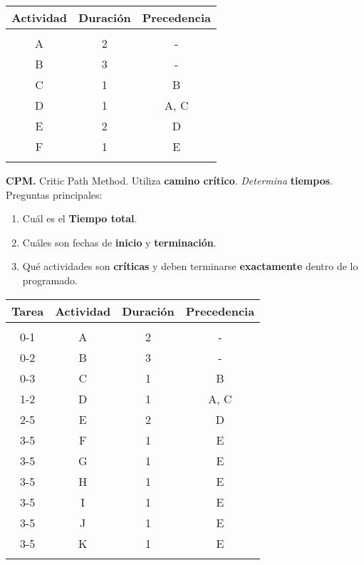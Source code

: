 \documentclass{article}
\begin{document}
\begin{center}
    \begin{tabular}{ c c c }
        Actividad & Duración & Precedencia\\
        \hline \\
        A         & 2        & -           \\
        B         & 3        & -           \\
        C         & 1        & B           \\
        D         & 1        & A, C        \\
        E         & 2        & D           \\
        F         & 1        & E           \\
        \hline\\
    \end{tabular}
\end{center}



\textbf{CPM.}
Critic Path Method.
Utiliza \textbf{camino crítico}.
\textit{Determina} \textbf{tiempos}.
Preguntas principales:

\begin{enumerate}
    \item Cuál es el \textbf{Tiempo total}.
    \item Cuáles son fechas de \textbf{inicio} y \textbf{terminación}.
    \item Qué actividades son \textbf{críticas} y deben terminarse \textbf{exactamente} dentro de lo programado.
\end{enumerate}

\begin{center}
    \begin{tabular}{ c c c c }
        Tarea & Actividad & Duración & Precedencia\\
        \hline \\
        0-1 & A         & 2        & -           \\
        0-2 & B         & 3        & -           \\
        0-3 & C         & 1        & B           \\
        1-2 & D         & 1        & A, C        \\
        2-5 & E         & 2        & D           \\
        3-5 & F         & 1        & E           \\
        3-5 & G         & 1        & E           \\
        3-5 & H         & 1        & E           \\
        3-5 & I         & 1        & E           \\
        3-5 & J         & 1        & E           \\
        3-5 & K         & 1        & E           \\
        \hline\\
    \end{tabular}
\end{center}
\end{document}
